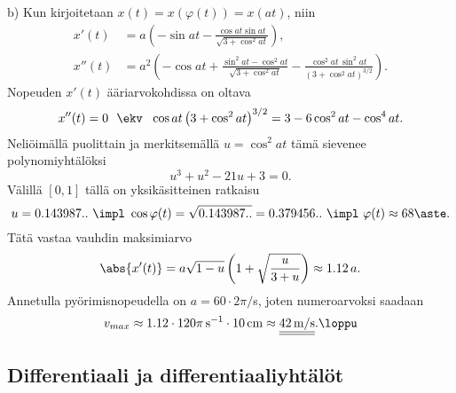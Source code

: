 b) Kun kirjoitetaan $x(t)=x(\varphi(t))=x(at)$, niin
\begin{align*}
x'(t)  &= a\left(-\sin at - \frac{\cos at\sin at}{\sqrt{3+\cos^2 at}}\right), \\
x''(t) &= a^2\left(-\cos at + \frac{\sin^2 at-\cos^2 at}{\sqrt{3+\cos^2 at}}
                            - \frac{\cos^2 at\,\sin^2 at}{(3+\cos^2 at)^{3/2}}\right).
\end{align*}
Nopeuden $x'(t)$ ääriarvokohdissa on oltava
\[
x''(t)=0\ \ \ekv\ \ \cos at\left(3+\cos^2 at\right)^{3/2} = 3-6\cos^2 at-\cos^4 at.
\]
Neliöimällä puolittain ja merkitsemällä $u=\cos^2 at$ tämä sievenee polynomiyhtälöksi
\[
u^3+u^2-21u+3=0.
\]
Välillä $[0,1]$ tällä on yksikäsitteinen ratkaisu
\[
u = 0.143987..\ \impl\ \cos\varphi(t) = \sqrt{0.143987..} = 0.379456..\ 
                \impl\ \varphi(t) \approx 68\aste.
\]
Tätä vastaa vauhdin maksimiarvo
\[
\abs{x'(t)} = a\sqrt{1-u}\left(1+\sqrt{\frac{u}{3+u}}\right) \approx 1.12\,a.
\]
Annetulla pyörimisnopeudella on $a=60 \cdot 2\pi/$s, joten numeroarvoksi saadaan
\[
v_{max} \approx 1.12 \cdot 120\pi\,\text{s}^{-1} \cdot 10\,\text{cm} 
                          \approx \underline{\underline{42\,\text{m/s}}}. \loppu
\]

\subsection{Differentiaali ja differentiaaliyhtälöt}

